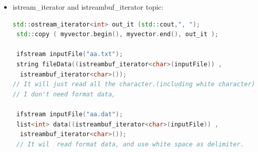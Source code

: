 \documentclass[a4paper,12pt,twoside]{book}
\begin{document}
\begin{itemize}
\item istream\_iterator and istreambuf\_iterator topic:
\begin{lstlisting}[frame=single, language=c++]
 std::ostream_iterator<int> out_it (std::cout,", ");
 std::copy ( myvector.begin(), myvector.end(), out_it );

 ifstream inputFile("aa.txt");
 string fileData((istreambuf_iterator<char>(inputFile)) ,
  istreambuf_iterator<char>());
// It will just read all the character.(including white character)
// I don't need format data,

 ifstream inputFile("aa.dat");
 list<int> data((istreambuf_iterator<char>(inputFile)) ,
  istreambuf_iterator<char>());
 // It wil  read format data, and use white space as delimiter.
\end{lstlisting}

\end{itemize}
\end{document}
